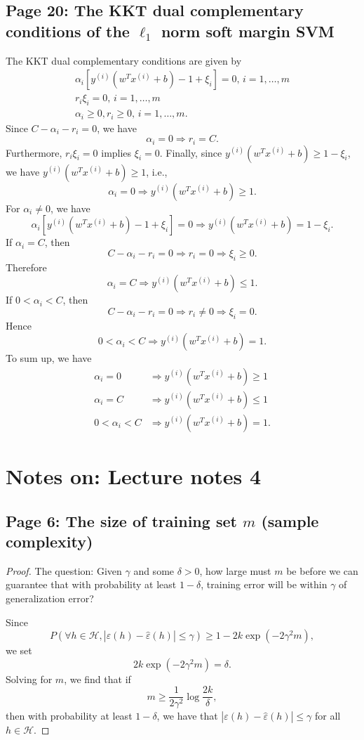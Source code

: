 \documentclass{article}
\begin{document}
\subsection{Page 20: The KKT dual complementary conditions of the $\ell_1$ norm soft margin SVM}
The KKT dual complementary conditions are given by
\begin{gather}
\alpha_i[y^{(i)}(w^Tx^{(i)}+b)-1+\xi_i]=0, \, i=1,\ldots,m\\
r_i\xi_i=0, \, i=1,\ldots,m\\
\alpha_i\geq 0, r_i\geq 0, \, i=1,\ldots,m.
\end{gather}
Since $C-\alpha_i-r_i=0$, we have
\[
\alpha_i=0 \Rightarrow r_i=C.
\]
Furthermore, $r_i\xi_i=0$ implies $\xi_i=0$. Finally, since $y^{(i)}(w^Tx^{(i)}+b)\geq 1-\xi_i$, we have $y^{(i)}(w^Tx^{(i)}+b)\geq 1$, i.e.,
\[
\alpha_i=0 \Rightarrow y^{(i)}(w^Tx^{(i)}+b)\geq 1.
\]
For $\alpha_i\neq 0$, we have
\[
\alpha_i[y^{(i)}(w^Tx^{(i)}+b)-1+\xi_i]=0 \Rightarrow y^{(i)}(w^Tx^{(i)}+b)=1-\xi_i.
\]
If $\alpha_i=C$, then
\[
C-\alpha_i-r_i=0\Rightarrow r_i=0\Rightarrow \xi_i\geq 0.
\]
Therefore
\[
\alpha_i=C \Rightarrow y^{(i)}(w^Tx^{(i)}+b)\leq 1.
\]
If $0<\alpha_i<C$, then
\[
C-\alpha_i-r_i=0\Rightarrow r_i\neq0\Rightarrow \xi_i= 0.
\]
Hence
\[
0<\alpha_i<C \Rightarrow y^{(i)}(w^Tx^{(i)}+b)=1.
\]
To sum up, we have
\[
\begin{split}
\alpha_i=0 &\Rightarrow y^{(i)}(w^Tx^{(i)}+b)\geq 1\\
\alpha_i=C &\Rightarrow y^{(i)}(w^Tx^{(i)}+b)\leq 1\\
0<\alpha_i<C &\Rightarrow y^{(i)}(w^Tx^{(i)}+b)=1.
\end{split}
\]


\section{Notes on: Lecture notes 4}
\subsection{Page 6: The size of training set $m$ (sample complexity)}
\begin{proof}
The question: Given $\gamma$ and some $\delta>0$, how large must $m$ be before we can guarantee that with probability at least $1-\delta$, training error will be within $\gamma$ of generalization error?

Since
\[
P(\forall h\in\mathcal{H}, |\varepsilon(h)-\hat{\varepsilon}(h)|\leq\gamma)\geq 1-2k\exp(-2\gamma^2m),
\]
we set
\[
2k\exp(-2\gamma^2m)= \delta.
\]
Solving for $m$, we find that if
\[
m \geq \frac{1}{2\gamma^2}\log\frac{2k}{\delta},
\]
then with probability at least $1-\delta$, we have that $|\varepsilon(h)-\hat{\varepsilon}(h)|\leq \gamma$ for all $h\in{\mathcal{H}}$.

\end{proof}
\end{document}
